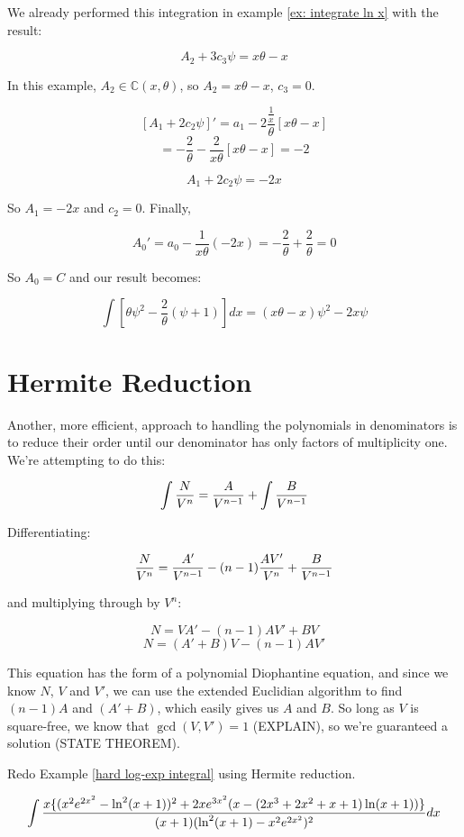 We already performed this integration in example \ref{ex: integrate ln x}
with the result:

$$A_2 + 3 c_3 \psi = x\theta - x$$

In this example, $A_2 \in {\mathbb C}(x,\theta)$, so $A_2 = x\theta -x$, $c_3=0$.

$$\left[ A_1 + 2 c_2 \psi \right]' = a_1 - 2 \frac{\frac{1}{x}}{\theta}[x\theta - x]$$
$$= -\frac{2}{\theta} - \frac{2}{x \theta}[x\theta - x] = -2$$

$$A_1 + 2 c_2 \psi = -2x$$

So $A_1 = -2x$ and $c_2 = 0$.  Finally,

$$A_0' = a_0 - \frac{1}{x \theta}(-2x) = -\frac{2}{\theta} + \frac{2}{\theta} = 0$$

So $A_0 = C$ and our result becomes:

$$\int \left[ \theta \psi^2 - \frac{2}{\theta}(\psi+1) \right] dx = (x\theta -x)\psi^2 - 2x \psi$$


\endexample

\vfill\eject

\section{Hermite Reduction}

Another, more efficient, approach to handling the polynomials in
denominators is to reduce their order until our denominator has only
factors of multiplicity one.  We're attempting to do this:

$$\int {N\over{V^n}} = {A\over{V^{n-1}}} + \int {B\over{V^{n-1}}}$$

Differentiating:

$${N\over{V^n}} = {A'\over{V^{n-1}}} - (n-1){AV'\over{V^n}} + {B\over{V^{n-1}}}$$

and multiplying through by $V^n$:

$$N = VA' - (n-1)AV' + BV$$
$$N = (A'+B)V - (n-1)AV'$$

This equation has the form of a polynomial Diophantine equation, and
since we know $N$, $V$ and $V'$, we can use the extended Euclidian
algorithm to find $(n-1)A$ and $(A'+B)$, which easily gives us $A$ and
$B$.  So long as $V$ is square-free, we know that $\gcd(V,V')=1$
(EXPLAIN), so we're guaranteed a solution (STATE THEOREM).

\example
Redo Example \ref{hard log-exp integral} using Hermite reduction.

$$\int{{x\{(x^2e^{2x^2}-\ln^2(x+1))^2+2xe^{3x^2}(x-(2x^3+2x^2+x+1)\ln(x+1))\}}\over{(x+1)(\ln^2(x+1) - x^2e^{2x^2})^2}} dx$$

